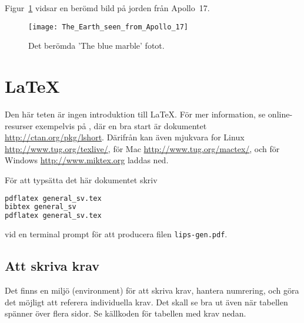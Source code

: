 \documentclass[10pt,oneside,swedish]{lips-no_customer}
\begin{document}
Figur~\ref{fig:bluemarble} vidsar en berömd bild på jorden från Apollo~17.
\begin{figure}[htbp]
  \centering
  \texttt{[image: The\_Earth\_seen\_from\_Apollo\_17]}
  \caption{Det berömda 'The blue marble' fotot.}
  \label{fig:bluemarble}
\end{figure}

\section{\LaTeX{}}
Den här teten är ingen introduktion till \LaTeX{}. För mer
information, se online-resurser exempelvis på \citep{TUG}, där en bra
start är dokumentet \url{http://ctan.org/pkg/lshort}. Därifrån kan
även mjukvara for Linux
\url{http://www.tug.org/texlive/}, för Mac
\url{http://www.tug.org/mactex/}, och för Windows
\url{http://www.miktex.org} laddas ned.

För att typsätta det här dokumentet skriv
\begin{lstlisting}[language=sh,frame=single]
pdflatex general_sv.tex
bibtex general_sv
pdflatex general_sv.tex
\end{lstlisting}
vid en terminal prompt för att producera filen \texttt{lips-gen.pdf}.

\subsection{Att skriva krav}
\lipsum[7]

Det finns en miljö (environment) för att skriva krav, hantera
numrering, och göra det möjligt att referera individuella krav. Det
skall se bra ut även när tabellen spänner över flera sidor. Se
källkoden för tabellen med krav nedan.
\end{document}
